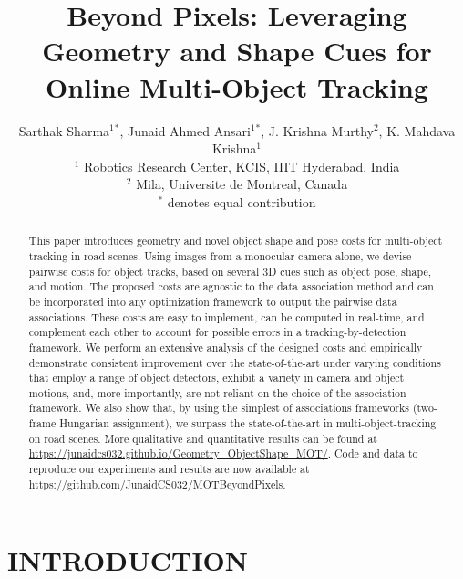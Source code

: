 \documentclass[letterpaper, 10 pt, conference]{ieeeconf}
\title{\LARGE \bf 
Beyond Pixels: Leveraging Geometry and Shape Cues for Online Multi-Object Tracking
}
\author{Sarthak Sharma$^{1}$$^{*}$, Junaid Ahmed Ansari$^{1}$$^{*}$, J. Krishna Murthy$^{2}$, K. Mahdava Krishna$^{1}$ \\
$^{1}$ \small Robotics Research Center, KCIS, IIIT Hyderabad, India \\
$^{2}$ \small Mila, Universite de Montreal, Canada \\
$^{*}$ \small denotes equal contribution}
\begin{document}



\begin{abstract}
This paper introduces geometry and novel object shape and pose costs for multi-object tracking in road scenes. Using images from a monocular camera alone, we devise pairwise costs for object tracks, based on several 3D cues such as object pose, shape, and motion. The proposed costs are agnostic to the data association method and can be incorporated into any optimization framework to output the pairwise data associations. These costs are easy to implement, can be computed in real-time, and complement each other to account for possible errors in a tracking-by-detection framework. We perform an extensive analysis of the designed costs and empirically demonstrate consistent improvement over the state-of-the-art under varying conditions that employ a range of object detectors, exhibit a variety in camera and object motions, and, more importantly, are not reliant on the choice of the  association framework. We also show that, by using the simplest of associations frameworks (two-frame Hungarian assignment), we surpass the state-of-the-art in multi-object-tracking on road scenes. More qualitative and quantitative results can be found at \url{https://junaidcs032.github.io/Geometry_ObjectShape_MOT/}. Code and data to reproduce our experiments and results are now available at \url{https://github.com/JunaidCS032/MOTBeyondPixels}. 

\end{abstract}


\section{INTRODUCTION}
\end{document}
